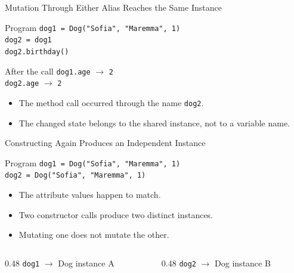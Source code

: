 \documentclass[aspectratio=169,10pt]{beamer}
\begin{document}
\begin{frame}{Mutation Through Either Alias Reaches the Same Instance}
  \begin{block}{Program}
    \texttt{dog1 = Dog("Sofia", "Maremma", 1)}\\
    \texttt{dog2 = dog1}\\
    \texttt{dog2.birthday()}
  \end{block}

  \begin{block}{After the call}
    \texttt{dog1.age} $\rightarrow$ \texttt{2}\\
    \texttt{dog2.age} $\rightarrow$ \texttt{2}
  \end{block}

  \begin{itemize}
    \item The method call occurred through the name \texttt{dog2}.
    \item The changed state belongs to the shared instance, not to a variable name.
  \end{itemize}
\end{frame}

\begin{frame}{Constructing Again Produces an Independent Instance}
  \begin{block}{Program}
    \texttt{dog1 = Dog("Sofia", "Maremma", 1)}\\
    \texttt{dog2 = Dog("Sofia", "Maremma", 1)}
  \end{block}

  \begin{itemize}
    \item The attribute values happen to match.
    \item Two constructor calls produce two distinct instances.
    \item Mutating one does not mutate the other.
  \end{itemize}

  \begin{columns}[T,onlytextwidth]
    \begin{column}{0.48\textwidth}
      \centering
      \texttt{dog1} $\rightarrow$ Dog instance A
    \end{column}
    \begin{column}{0.48\textwidth}
      \centering
      \texttt{dog2} $\rightarrow$ Dog instance B
    \end{column}
  \end{columns}
\end{frame}
\end{document}
